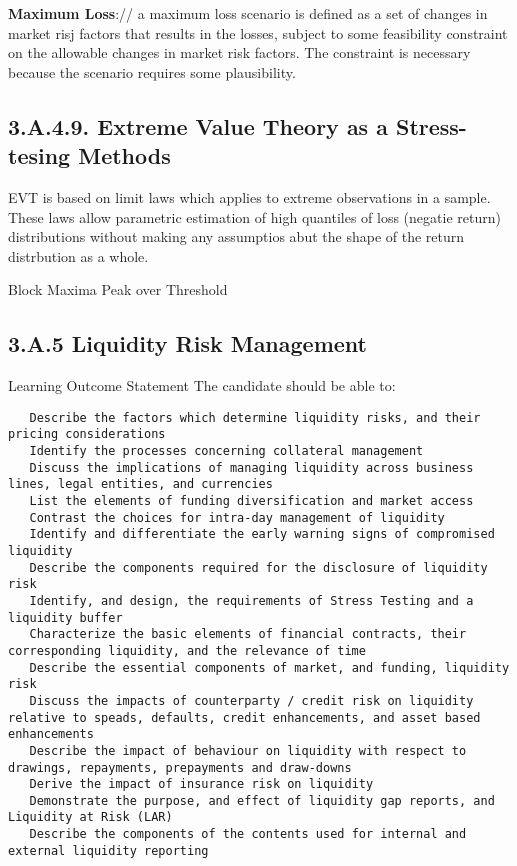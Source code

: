 \documentclass[]{report}
\begin{document}
\textbf{Maximum Loss}://
a maximum loss scenario is defined as a set of changes in market risj factors that results in the losses, subject to some feasibility constraint on the allowable changes in market risk factors.
The constraint is necessary because the scenario requires some plausibility.

\subsection*{3.A.4.9. Extreme Value Theory as a Stress-tesing Methods}

EVT is based on limit laws which applies to extreme observations in a sample.
These laws allow parametric estimation of high quantiles of loss (negatie return) distributions without making any assumptios abut the shape of the return distrbution as a whole.  

Block Maxima
Peak over Threshold

 \subsection{3.A.5 Liquidity Risk Management }
 Learning Outcome Statement
 The candidate should be able to:
 \begin{verbatim}
   Describe the factors which determine liquidity risks, and their pricing considerations
   Identify the processes concerning collateral management
   Discuss the implications of managing liquidity across business lines, legal entities, and currencies
   List the elements of funding diversification and market access
   Contrast the choices for intra-day management of liquidity
   Identify and differentiate the early warning signs of compromised liquidity
   Describe the components required for the disclosure of liquidity risk
   Identify, and design, the requirements of Stress Testing and a liquidity buffer
   Characterize the basic elements of financial contracts, their corresponding liquidity, and the relevance of time
   Describe the essential components of market, and funding, liquidity risk
   Discuss the impacts of counterparty / credit risk on liquidity relative to speads, defaults, credit enhancements, and asset based enhancements
   Describe the impact of behaviour on liquidity with respect to drawings, repayments, prepayments and draw-downs
   Derive the impact of insurance risk on liquidity
   Demonstrate the purpose, and effect of liquidity gap reports, and Liquidity at Risk (LAR)
   Describe the components of the contents used for internal and external liquidity reporting
  \end{verbatim}
  
\end{document}
